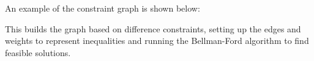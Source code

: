 \begin{example}
    An example of the constraint graph is shown below:


    This builds the graph based on difference constraints, setting up the edges and weights to represent inequalities and running the Bellman-Ford algorithm to find feasible solutions.
\end{example}